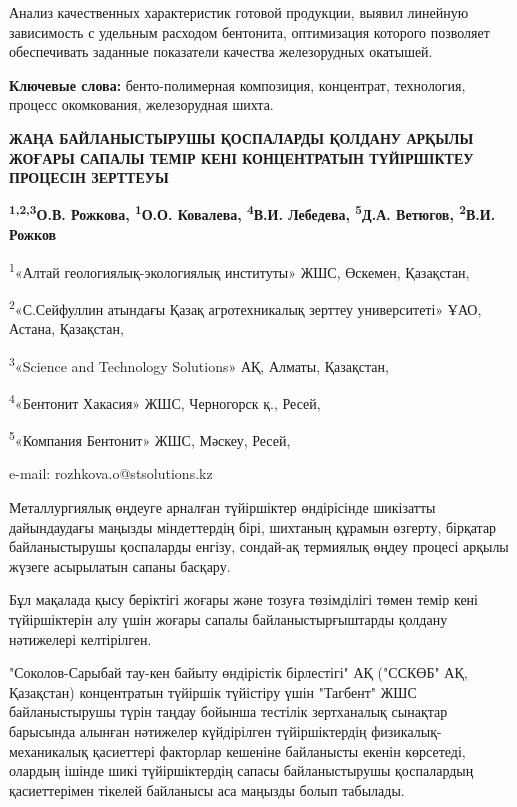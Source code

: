 Анализ качественных характеристик готовой продукции, выявил линейную
зависимость с удельным расходом бентонита, оптимизация которого
позволяет обеспечивать заданные показатели качества железорудных
окатышей.

{\bfseries Ключевые слова:} бенто-полимерная композиция, концентрат,
технология, процесс окомкования, железорудная шихта.

\begin{articleheader}
{\bfseries ЖАҢА БАЙЛАНЫСТЫРУШЫ ҚОСПАЛАРДЫ ҚОЛДАНУ АРҚЫЛЫ ЖОҒАРЫ САПАЛЫ ТЕМІР КЕНІ КОНЦЕНТРАТЫН ТҮЙІРШІКТЕУ ПРОЦЕСІН ЗЕРТТЕУЫ}

{\bfseries
\textsuperscript{1,2,3}О.В. Рожкова\textsuperscript{\envelope },
\textsuperscript{1}О.О. Ковалева,
\textsuperscript{4}В.И. Лебедева,
\textsuperscript{5}Д.А. Ветюгов,
\textsuperscript{2}В.И. Рожков
}
\end{articleheader}

\begin{affiliation}
\textsuperscript{1}«Алтай геологиялық-экологиялық институты» ЖШС, Өскемен, Қазақстан,

\textsuperscript{2}«С.Сейфуллин атындағы Қазақ агротехникалық зерттеу университеті» ҰАО, Астана, Қазақстан,

\textsuperscript{3}«Science and Technology Solutions» АҚ, Алматы, Қазақстан,

\textsuperscript{4}«Бентонит Хакасия» ЖШС, Черногорск қ., Ресей,

\textsuperscript{5}«Компания Бентонит» ЖШС, Мәскеу, Ресей,

e-mail: rozhkova.o@stsolutions.kz
\end{affiliation}

Металлургиялық өңдеуге арналған түйіршіктер өндірісінде шикізатты
дайындаудағы маңызды міндеттердің бірі, шихтаның құрамын өзгерту,
бірқатар байланыстырушы қоспаларды енгізу, сондай-ақ термиялық өңдеу
процесі арқылы жүзеге асырылатын сапаны басқару.

Бұл мақалада қысу беріктігі жоғары және тозуға төзімділігі төмен темір
кені түйіршіктерін алу үшін жоғары сапалы байланыстырғыштарды қолдану
нәтижелері келтірілген.

"Соколов-Сарыбай тау-кен байыту өндірістік бірлестігі" АҚ ("ССКӨБ" АҚ,
Қазақстан) концентратын түйіршік түйістіру үшін "Тагбент" ЖШС
байланыстырушы түрін таңдау бойынша тестілік зертханалық сынақтар
барысында алынған нәтижелер күйдірілген түйіршіктердің
физикалық-механикалық қасиеттері факторлар кешеніне байланысты екенін
көрсетеді, олардың ішінде шикі түйіршіктердің сапасы байланыстырушы
қоспалардың қасиеттерімен тікелей байланысы аса маңызды болып табылады.

